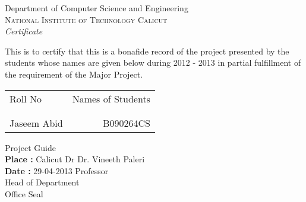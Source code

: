 \newpage
\thispagestyle{empty}

\begin{center}

\huge{Department of Computer Science and Engineering}\\[0.5cm]
\normalsize
\textsc{National Institute of Technology Calicut}\\[2.0cm]

\emph{\LARGE Certificate}\\[2.5cm]
\end{center}
\normalsize
This is to certify that this is a bonafide record of the project presented by
the students whose names are given below during 2012 - 2013 in partial
fulfillment of the requirement
of the Major Project.\\[1.0cm]

\begin{table}[h]
\centering
\begin{tabular}{lr}
Roll No & Names of Students \\ \\ \hline
\\
Jaseem Abid & B090264CS
\end{tabular}
\end{table}

\vspace*{1.0cm}
\noindent

\hfill Project Guide\\
\textbf{Place :} Calicut \hfill Dr Dr. Vineeth Paleri\\
\textbf{Date :} 29-04-2013 \hfill Professor\\

\vspace*{1.0cm}
\hfill Head of Department\\

\vspace*{1.5cm}
\hfill Office Seal\\
